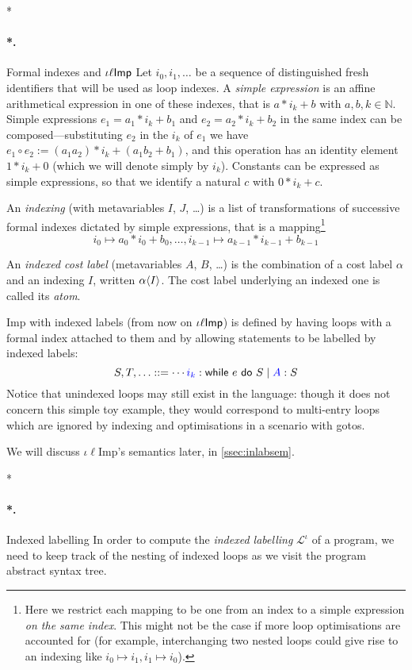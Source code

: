 \documentclass[submission,copyright,creativecommons]{eptcs}
\makeatletter
\theoremstyle{definition}
\newcommand{\s}[1]{{\sf #1}}    \newcommand{\vc}[1]{{\bf #1}}
\newcommand{\imp}{{\sf Imp}}            \newcommand{\vm}{{\sf Vm}}              \newcommand{\mips}{{\sf Mips}}          \newcommand{\Clight}{{\sf Clight}}        \newcommand{\Cminor}{{\sf Cminor}}
\newcommand{\sop}[1]{\s{#1}\ }
\newcommand{\sbin}[1]{\ \s{#1}\ }
\newcommand{\Ell}{\mathcal L}
\newcommand{\alphab}{A}
\newcommand{\betab}{B}
\newcommand{\gramm}{\mathrel{::=}}
\newcommand{\ass}{\mathrel{:=}}
\def\lbl#1:{\mbox{\color{blue}$#1$}:}
\let\oldparagraph\paragraph
\def\paragraph{\@ifnextchar*\new@paragraph@star\new@paragraph}
\def\new@paragraph@star*#1{\oldparagraph*{#1.}}
\def\new@paragraph#1{\oldparagraph{#1.}}
\makeatother
\begin{document}
\paragraph*{Formal indexes and $\iota\ell\imp$}
Let $i_0,i_1,\ldots$ be a sequence of distinguished fresh identifiers that will be used as loop indexes.
A \emph{simple expression} is an affine arithmetical expression in one of these indexes, that is $a*i_k+b$ with $a,b,k \in \mathbb N$.
\label{pag:exprcomp}Simple expressions $e_1=a_1*i_k+b_1$ and $e_2=a_2*i_k+b_2$ in the same index can be composed---substituting $e_2$ in the $i_k$ of $e_1$ we have $e_1\circ e_2\ass (a_1a_2)*i_k + (a_1b_2+b_1)$, and this operation has an identity element $1*i_k+0$ (which we will denote simply by $i_k$).
Constants can be expressed as simple expressions, so that we identify a natural $c$ with $0*i_k+c$.

An \emph{indexing} (with metavariables $I$, $J$, \ldots) is a list of transformations of successive formal indexes dictated by simple expressions, that is a mapping\footnote{Here we restrict each mapping to be one from an index to a
    simple expression \emph{on the same index}. This might not be the case if more loop
    optimisations are accounted for (for example, interchanging two nested
    loops could give rise to an indexing like $i_0\mapsto i_1,i_1\mapsto i_0$).}
$$
i_0\mapsto a_0*i_0+b_0,\dots, i_{k-1} \mapsto a_{k-1}*i_{k-1}+b_{k-1}
$$

An \emph{indexed cost label} (metavariables $\alphab$, $\betab$, \ldots) is the combination of a cost label $\alpha$ and an indexing $I$, written $\alpha\langle I\rangle$.
The cost label underlying an indexed one is called its \emph{atom}.

\imp{} with indexed labels (from now on $\iota\ell\imp$) is defined by
having loops with a formal index attached to them and by allowing statements to
be labelled by indexed labels:
$$
S,T,\ldots \gramm \cdots \lbl{i_k}:\sop{while}e\sbin{do}S\mid \lbl\alphab : S
$$
Notice that unindexed loops may still exist in the language: though it does not
concern this simple toy example, they would correspond to multi-entry loops which
are ignored by indexing and optimisations in a scenario with gotos.

We will discuss $\iota\ell$\imp{}'s semantics later, in \autoref{ssec:inlabsem}.

\paragraph*{Indexed labelling}
In order to compute the \emph{indexed labelling} $\Ell^\iota$ of a program, we
need to keep track of the nesting of indexed loops as we visit the program
abstract syntax tree.
\end{document}

